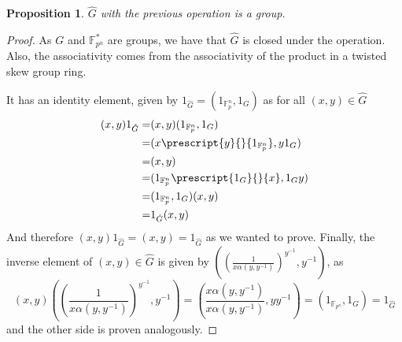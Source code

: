 \documentclass{article}
\newtheorem{proposition}[theorem]{Proposition}
\begin{document}
\begin{proposition} \label{hatGisgroup}
    $\hat{G}$ with the previous operation is a group. 
\end{proposition}
\begin{proof}
    As $G$ and $\mathbb{F}_{p^n}^*$ are groups, we have that $\hat{G}$ is closed under the operation. Also, the associativity comes from the associativity of the product in a twisted skew group ring. 

    It has an identity element, given by $1_{\hat{G}} = (1_{\mathbb{F}_p^n}, 1_G)$ as for all $(x,y) \in \hat{G}$
    \begin{align*}
        (x,y) 1_{\hat{G}} = &  (x,y) (1_{\mathbb{F}_p^n}, 1_G) \\ = & (x \prescript{y}{}{1_{\mathbb{F}_p^n}}, y 1_G )  \\ = & (x,y)  \\ = & (  1_{\mathbb{F}_p^n}\prescript{1_G}{}{x},  1_G y)  \\ = & (1_{\mathbb{F}_p^n}, 1_G)  (x,y)  \\ = & 1_{\hat{G}} (x,y)
    \end{align*}
    And therefore $(x,y) 1_{\hat{G}} = (x,y) = 1_{\hat{G}}  $ as we wanted to prove. 
    Finally, the inverse element of $(x,y) \in \hat{G}$ is given by $\left( \left(\frac{1}{x\alpha(y,y^{-1})}\right)^{y^{-1}},y^{-1} \right)$, as 
    \begin{equation}
        (x,y)  \left( \left(\frac{1}{x\alpha(y,y^{-1})}\right)^{y^{-1}},y^{-1} \right) = \left( \frac{x\alpha(y,y^{-1})}{x\alpha(y,y^{-1})} , y y^{-1}\right) = (1_{\mathbb{F}_{p^n}},1_G) = 1_{\hat{G}}
    \end{equation}
    and the other side is proven analogously.
\end{proof}
\end{document}
